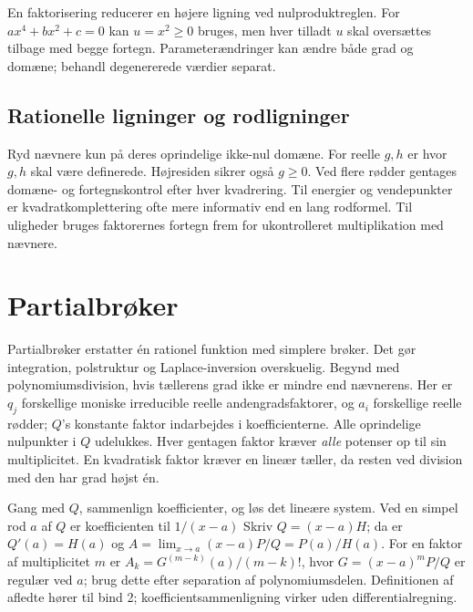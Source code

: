 

En faktorisering reducerer en højere ligning ved nulproduktreglen.
For $ax^4+bx^2+c=0$ kan $u=x^2\ge0$ bruges, men hver tilladt $u$
skal oversættes tilbage med begge fortegn. Parameterændringer kan ændre
både grad og domæne; behandl degenererede værdier separat.

\subsection{Rationelle ligninger og rodligninger}
Ryd nævnere kun på deres oprindelige ikke-nul domæne.
For reelle $g,h$ er
hvor $g,h$ skal være definerede. Højresiden sikrer også $g\ge0$.
Ved flere rødder gentages domæne- og fortegnskontrol efter hver kvadrering.
Til energier og vendepunkter er kvadratkomplettering ofte mere informativ
end en lang rodformel. Til uligheder bruges faktorernes fortegn frem
for ukontrolleret multiplikation med nævnere.

\section{Partialbrøker}
\label{sec:b1-partialbroeker}
Partialbrøker erstatter én rationel funktion med simplere brøker.
Det gør integration, polstruktur og Laplace-inversion overskuelig.
Begynd med polynomiumsdivision, hvis tællerens grad ikke er mindre end
nævnerens.
Her er $q_j$ forskellige moniske irreducible reelle andengradsfaktorer,
og $a_i$ forskellige reelle rødder; $Q$'s konstante faktor indarbejdes i
koefficienterne. Alle oprindelige nulpunkter i $Q$ udelukkes.
Hver gentagen faktor kræver \emph{alle} potenser op til sin multiplicitet.
En kvadratisk faktor kræver en lineær tæller, da resten ved division med
den har grad højst én.

Gang med $Q$, sammenlign koefficienter, og løs det lineære system.
Ved en simpel rod $a$ af $Q$ er koefficienten til $1/(x-a)$
Skriv $Q=(x-a)H$; da er $Q'(a)=H(a)$ og
$A=\lim_{x\to a}(x-a)P/Q=P(a)/H(a)$.
For en faktor af multiplicitet $m$ er
$A_k=G^{(m-k)}(a)/(m-k)!$, hvor $G=(x-a)^mP/Q$ er regulær ved $a$;
brug dette efter separation af polynomiumsdelen. Definitionen af afledte
hører til bind 2; koefficientsammenligning virker uden differentialregning.


